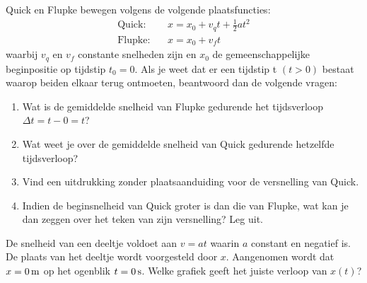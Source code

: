 \begin{exercise} Quick en Flupke bewegen volgens de volgende plaatsfuncties:
\begin{eqnarray*}
\mathrm{Quick:}&&x=x_0+v_qt+\frac{1}{2}at^2\\
\mathrm{Flupke:}&&x=x_0+v_ft
\end{eqnarray*}
waarbij $v_{q}$ en $v_{f}$ constante snelheden zijn en $x_0$ de gemeenschappelijke beginpositie op tijdstip $t_0=0$. Als je weet dat er een tijdstip t $(t>0)$ bestaat waarop beiden elkaar terug ontmoeten, beantwoord dan de volgende vragen:
\begin{enumerate}
\item Wat is de gemiddelde snelheid van Flupke gedurende het tijdsverloop $\Delta t=t-0=t$? 
\item Wat weet je over de gemiddelde snelheid van Quick gedurende hetzelfde tijdsverloop?
\item Vind een uitdrukking zonder plaatsaanduiding voor de versnelling van Quick. 
\item Indien de beginsnelheid van Quick groter is dan die van Flupke, wat kan je
dan zeggen over het teken van zijn versnelling? Leg uit. 
\end{enumerate}

\end{exercise}

\begin{exercise} De snelheid van een deeltje voldoet aan $v=at$ waarin $a$ constant en negatief is. De plaats van het deeltje wordt voorgesteld door $x$. Aangenomen wordt dat $x=0\rm\,m$ op het ogenblik $t=0\rm\,s$. Welke grafiek geeft het juiste verloop van $x(t)$?

\end{exercise}

